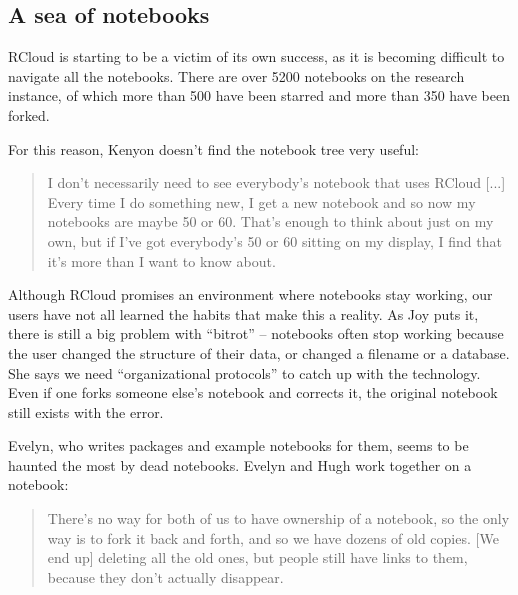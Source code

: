 

\subsection{A sea of notebooks}
RCloud is starting to be a victim of its own success, as it is becoming
difficult to navigate all the notebooks.  There are over 5200 notebooks on
the research instance, of which more than 500 have been starred and more
than 350 have been forked.

For this reason, Kenyon doesn't find the notebook tree very useful:
\begin{quote}
I don't necessarily need to see everybody's notebook that uses RCloud [...] Every
time I do something new, I get a new notebook and so now my notebooks are maybe
50 or 60. That's enough to think about just on my own, but if I've got
everybody's 50 or 60 sitting on my display, I find that it's more than I want to
know about.
\end{quote}

Although RCloud promises an environment where notebooks stay working, our
users have not all learned the habits that make this a reality. As Joy
puts it, there is still a big problem with ``bitrot'' -- notebooks often
stop working because the user changed the structure of their data, or
changed a filename or a database.  She says we need ``organizational
protocols'' to catch up with the technology. Even if one forks someone
else's notebook and corrects it, the original notebook still exists with
the error.


Evelyn, who writes packages and example notebooks for them, seems to be
haunted the most by dead notebooks. Evelyn and Hugh work together on a notebook:
\begin{quote}
There's no way for both of us to have ownership of a notebook, so the only
way is to fork it back and forth, and so we have dozens of old copies. [We
end up] deleting all the old ones, but people still have links to them,
because they don't actually disappear.
\end{quote}

